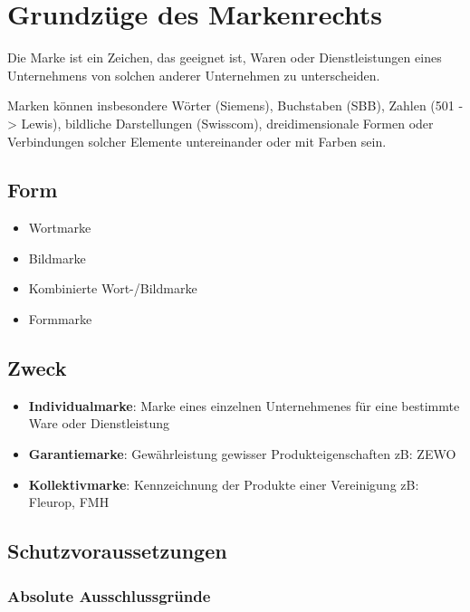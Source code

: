 \hypertarget{grundzuxfcge-des-markenrechts}{%
\section{Grundzüge des
Markenrechts}\label{grundzuxfcge-des-markenrechts}}

Die Marke ist ein Zeichen, das geeignet ist, Waren oder Dienstleistungen
eines Unternehmens von solchen anderer Unternehmen zu unterscheiden.

Marken können insbesondere Wörter (Siemens), Buchstaben (SBB), Zahlen
(501 -\textgreater{} Lewis), bildliche Darstellungen (Swisscom),
dreidimensionale Formen oder Verbindungen solcher Elemente untereinander
oder mit Farben sein.

\hypertarget{form}{%
\subsection{Form}\label{form}}

\begin{itemize}
\tightlist
\item
  Wortmarke
\item
  Bildmarke
\item
  Kombinierte Wort-/Bildmarke
\item
  Formmarke
\end{itemize}

\hypertarget{zweck}{%
\subsection{Zweck}\label{zweck}}

\begin{itemize}
\tightlist
\item
  \textbf{Individualmarke}: Marke eines einzelnen Unternehmenes für eine
  bestimmte Ware oder Dienstleistung
\item
  \textbf{Garantiemarke}: Gewährleistung gewisser Produkteigenschaften
  zB: ZEWO
\item
  \textbf{Kollektivmarke}: Kennzeichnung der Produkte einer Vereinigung
  zB: Fleurop, FMH
\end{itemize}

\hypertarget{schutzvoraussetzungen}{%
\subsection{Schutzvoraussetzungen}\label{schutzvoraussetzungen}}

\hypertarget{absolute-ausschlussgruxfcnde}{%
\subsubsection{Absolute
Ausschlussgründe}\label{absolute-ausschlussgruxfcnde}}


